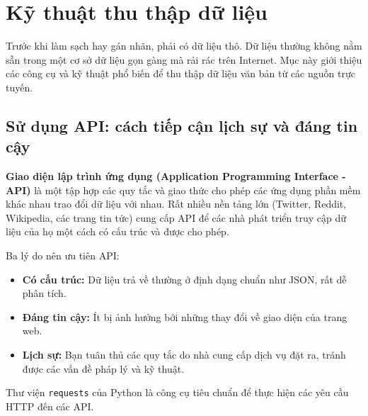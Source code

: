 
\section{Kỹ thuật thu thập dữ liệu}
\label{sec:data_collection}

Trước khi làm sạch hay gán nhãn, phải có dữ liệu thô. Dữ liệu thường không nằm sẵn trong một cơ sở dữ liệu gọn gàng mà rải rác trên Internet. Mục này giới thiệu các công cụ và kỹ thuật phổ biến để thu thập dữ liệu văn bản từ các nguồn trực tuyến.

\subsection{Sử dụng API: cách tiếp cận lịch sự và đáng tin cậy}
\label{ssec:apis}
\textbf{Giao diện lập trình ứng dụng (Application Programming Interface - API)} là một tập hợp các quy tắc và giao thức cho phép các ứng dụng phần mềm khác nhau trao đổi dữ liệu với nhau. Rất nhiều nền tảng lớn (Twitter, Reddit, Wikipedia, các trang tin tức) cung cấp API để các nhà phát triển truy cập dữ liệu của họ một cách có cấu trúc và được cho phép.

Ba lý do nên ưu tiên API:
\begin{itemize}
    \item \textbf{Có cấu trúc:} Dữ liệu trả về thường ở định dạng chuẩn như JSON, rất dễ phân tích.
    \item \textbf{Đáng tin cậy:} Ít bị ảnh hưởng bởi những thay đổi về giao diện của trang web.
    \item \textbf{Lịch sự:} Bạn tuân thủ các quy tắc do nhà cung cấp dịch vụ đặt ra, tránh được các vấn đề pháp lý và kỹ thuật.
\end{itemize}

Thư viện \texttt{requests} của Python là công cụ tiêu chuẩn để thực hiện các yêu cầu HTTP đến các API.

